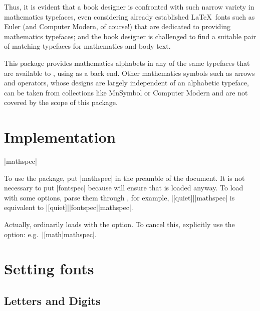 \documentclass{ltxdockit}
\newcommand\permitbreak{\linebreak[0]}
\begin{document}
Thus, it is evident that a book designer is confronted with such narrow variety in mathematics typefaces, even considering already established \LaTeX\ fonts such as  Euler (and Computer Modern, of course!) that are dedicated to providing mathematics typefaces; and the book designer is challenged to find a suitable pair of matching typefaces for mathematics and body text.

This package provides mathematics alphabets in any of the same typefaces that are available to \XeTeX, using  as a back end. Other mathematics symbols such as arrows and operators, whose designs are largely independent of an alphabetic typeface, can be taken from collections like MnSymbol or Computer Modern and are not covered by the scope of this package.

\section{Implementation}

\begin{ltxsyntax}

|{mathspec}|

\noindent To use the package, put |{mathspec}| in the preamble of the document. It is not necessary to put |{fontspec}| because  will ensure that  is loaded anyway. To load  with some options, parse them through , for example, |[quiet]|\permitbreak|{mathspec}| is equivalent to \permitbreak|[quiet]|\permitbreak|{fontspec}||{mathspec}|.

Actually,  ordinarily loads  with the  option. To cancel this, explicitly use the  option: e.g.\ |[math]{mathspec}|.

\end{ltxsyntax}

\section{Setting fonts}

\subsection{Letters and Digits}
\end{document}
